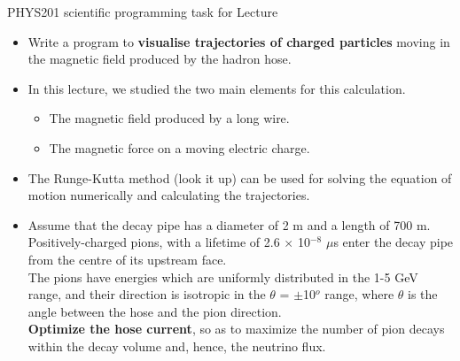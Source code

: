 {\begin{frame}{PHYS201 scientific programming task for Lecture \thislecture}
\begin{itemize}
  \item Write a program to {\bf visualise trajectories of charged particles}
        moving in the magnetic field produced by the hadron hose.
  \vspace{0.3cm}
  \item In this lecture, we studied the two main elements for this calculation.
        \begin{itemize}
          \item The magnetic field produced by a long wire.
          \item The magnetic force on a moving electric charge.
        \end{itemize}
  \item The Runge-Kutta method (look it up) can be used for solving the equation
        of motion numerically and calculating the trajectories.
  \vspace{0.3cm}
  \item Assume that the decay pipe has a diameter of 2 m and a length of 700 m.
        Positively-charged pions, with a lifetime of 2.6 $\times$ 10$^{-8}$ $\mu$s
        enter the decay pipe from the centre of its upstream face.\\
        The pions have energies which are uniformly distributed in the 1-5 GeV range,
        and their direction is isotropic in the $\theta$ = $\pm$10$^{o}$ range,
        where $\theta$ is the angle between the hose and the pion direction.\\
        {\bf Optimize the hose current}, so as to maximize the number of pion decays
        within the decay volume and, hence, the neutrino flux.
\end{itemize}

\end{frame}


} %


